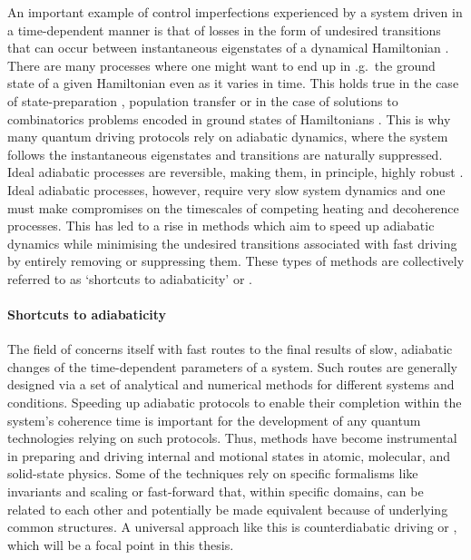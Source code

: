 An important example of control imperfections experienced by a system driven in a time-dependent manner is that of losses in the form of undesired transitions that can occur between instantaneous eigenstates of a dynamical Hamiltonian \cite{berry_transitionless_2009, kolodrubetz_geometry_2017}. There are many processes where one might want to end up in \@e.g.~the ground state of a given Hamiltonian even as it varies in time. This holds true in the case of state-preparation \cite{dimitrova_many-body_2023}, population transfer \cite{meier_counterdiabatic_2020} or in the case of solutions to combinatorics problems encoded in ground states of Hamiltonians \cite{pichler_quantum_2018, ebadi_quantum_2022}. This is why many quantum driving protocols rely on adiabatic dynamics, where the system follows the instantaneous eigenstates and transitions are naturally suppressed\cite{born_beweis_1928, kato_adiabatic_1950}. Ideal adiabatic processes are reversible, making them, in principle, highly robust \cite{jarzynski_geometric_1995, kolodrubetz_geometry_2017}. Ideal adiabatic processes, however, require very slow system dynamics and one must make compromises on the timescales of competing heating and decoherence processes. This has led to a rise in methods which aim to speed up adiabatic dynamics while minimising the undesired transitions associated with fast driving by entirely removing or suppressing them. These types of methods are collectively referred to as `shortcuts to adiabaticity' or  \cite{guery-odelin_shortcuts_2019, torrontegui_chapter_2013}. 

\paragraph*{Shortcuts to adiabaticity} 

The field of  concerns itself with fast routes to the final results of slow, adiabatic changes of the time-dependent parameters of a system. Such routes are generally designed via a set of analytical and numerical methods for different systems and conditions. Speeding up adiabatic protocols to enable their completion within the system’s coherence time is important
for the development of any quantum technologies relying on such protocols. Thus,  methods have become instrumental in preparing and driving internal and motional states in atomic, molecular, and solid-state physics. Some of the  techniques rely on specific formalisms like invariants and scaling \cite{deffner_classical_2014, deng_superadiabatic_2018, chen_fast_2010} or fast-forward \cite{masuda_fast-forward_2009, masuda_fast-forward_2008} that, within specific domains, can be related to each other and potentially be made equivalent because of underlying common structures. A universal  approach like this is counterdiabatic driving or , which will be a focal point in this thesis. 

